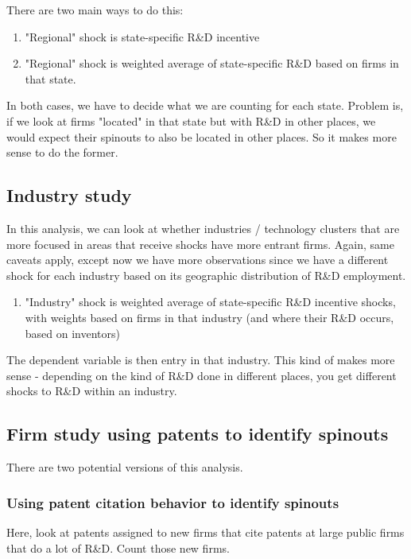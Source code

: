 \documentclass[12pt,english]{article}
\theoremstyle{remark}
\begin{document}
There are two main ways to do this:
\begin{enumerate}
	\item "Regional" shock is state-specific R\&D incentive
	\item "Regional" shock is weighted average of state-specific R\&D based on firms in that state.  
\end{enumerate}

In both cases, we have to decide what we are counting for each state. Problem is, if we look at firms "located" in that state but with R\&D in other places, we would expect their spinouts to also be located in other places. So it makes more sense to do the former.

\subsection{Industry study}

In this analysis, we can look at whether industries / technology clusters that are more focused in areas that receive shocks have more entrant firms. Again, same caveats apply, except now we have more observations since we have a different shock for each industry based on its geographic distribution of R\&D employment.

\begin{enumerate}
	\item "Industry" shock is weighted average of state-specific R\&D incentive shocks, with weights based on firms in that industry (and where their R\&D occurs, based on inventors)
\end{enumerate}

The dependent variable is then entry in that industry. This kind of makes more sense - depending on the kind of R\&D done in different places, you get different shocks to R\&D within an industry. 

\subsection{Firm study using patents to identify spinouts}

There are two potential versions of this analysis.

\subsubsection{Using patent citation behavior to identify spinouts}
Here, look at patents assigned to new firms that cite patents at large public firms that do a lot of R\&D. Count those new firms.
\end{document}
